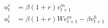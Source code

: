   \begin{align}
    u^c_t &=\beta(1+r)v_{t+1}^m \label{eq:focc} \\
    u^l_t &= \beta(1+r)W v_{t+1}^m - \beta v_{t+1}^h \label{eq:focl}
  \end{align}
